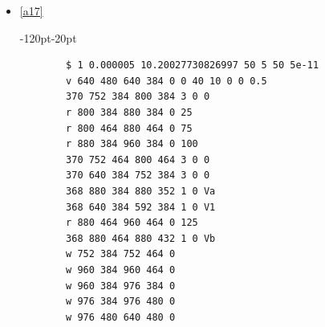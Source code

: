 \documentclass{article}
\begin{document}
\begin{itemize}
\begin{adjustwidth}{-120pt}{-20pt}
\begin{lstlisting}
		370 960 384 1040 384 3 0 0
		368 880 336 880 304 1 0 Va
		368 720 384 672 384 1 0 V1
		w 880 336 880 384 0
		w 800 464 800 384 0
		w 960 464 1040 464 0
		w 1040 464 1040 384 0
		w 1040 384 1056 384 0
		w 1056 384 1056 496 0
		w 1056 496 720 496 0
		w 720 496 720 480 0	
	\end{lstlisting}
\end{adjustwidth}
\clearpage
	\item \href{https://www.falstad.com/circuit/circuitjs.html?ctz=CQAgjCAMB0l3BWcMBMcUHYMGZIA4UA2ATmIxAUgoqoQFMBaMMAKADcRCAWKrvK7lWx4uUMT2RiqMBC2wYqGBChDDR-ISNVSWAJxAbVWvPyOiqKWfsNduB07fMgle+5tHFC7sWDhyFzsogjgZwwXbYOvICEmqBKnGR0nKEeG5m6dhBEFQAagCGKWmCGQjECVo5ILms1g52nrx2VGCWRekhJrzYKlW5AEYsAO7xGUoqIZDDII0Zs5PTs3FkhBlTIytzGKt8yRvbwaYlu1AsQA}{\ref{a17}}  \\
\begin{adjustwidth}{-120pt}{-20pt}
	\begin{lstlisting}
		$ 1 0.000005 10.20027730826997 50 5 50 5e-11
		v 640 480 640 384 0 0 40 10 0 0 0.5
		370 752 384 800 384 3 0 0
		r 800 384 880 384 0 25
		r 800 464 880 464 0 75
		r 880 384 960 384 0 100
		370 752 464 800 464 3 0 0
		370 640 384 752 384 3 0 0
		368 880 384 880 352 1 0 Va
		368 640 384 592 384 1 0 V1
		r 880 464 960 464 0 125
		368 880 464 880 432 1 0 Vb
		w 752 384 752 464 0
		w 960 384 960 464 0
		w 960 384 976 384 0
		w 976 384 976 480 0
		w 976 480 640 480 0	
	\end{lstlisting}
\end{adjustwidth}


\end{itemize}
\end{document}
